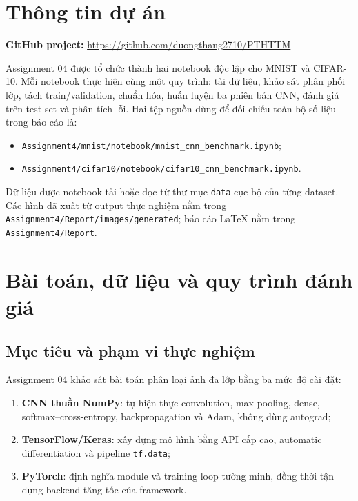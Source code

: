 \documentclass[12pt,a4paper]{report}
\newcommand{\modelpath}[1]{\texttt{#1}}
\begin{document}
\chapter*{Thông tin dự án}

\noindent\textbf{GitHub project:}
\url{https://github.com/duongthang2710/PTHTTM}

\vspace{0.35cm}
\noindent
Assignment 04 được tổ chức thành hai notebook độc lập cho MNIST và CIFAR-10.
Mỗi notebook thực hiện cùng một quy trình: tải dữ liệu, khảo sát phân phối lớp,
tách train/validation, chuẩn hóa, huấn luyện ba phiên bản CNN, đánh giá trên test
set và phân tích lỗi. Hai tệp nguồn dùng để đối chiếu toàn bộ số liệu trong báo
cáo là:
\begin{itemize}
    \item \modelpath{Assignment4/mnist/notebook/mnist\_cnn\_benchmark.ipynb};
    \item \modelpath{Assignment4/cifar10/notebook/cifar10\_cnn\_benchmark.ipynb}.
\end{itemize}

\noindent
Dữ liệu được notebook tải hoặc đọc từ thư mục \modelpath{data} cục bộ của từng
dataset. Các hình đã xuất từ output thực nghiệm nằm trong
\modelpath{Assignment4/Report/images/generated}; báo cáo \LaTeX{} nằm trong
\modelpath{Assignment4/Report}.
\newpage

\chapter{Bài toán, dữ liệu và quy trình đánh giá}

\section{Mục tiêu và phạm vi thực nghiệm}
Assignment 04 khảo sát bài toán phân loại ảnh đa lớp bằng ba mức độ cài đặt:
\begin{enumerate}
    \item \textbf{CNN thuần NumPy}: tự hiện thực convolution, max pooling,
    dense, softmax--cross-entropy, backpropagation và Adam, không dùng autograd;
    \item \textbf{TensorFlow/Keras}: xây dựng mô hình bằng API cấp cao,
    automatic differentiation và pipeline \texttt{tf.data};
    \item \textbf{PyTorch}: định nghĩa module và training loop tường minh,
    đồng thời tận dụng backend tăng tốc của framework.
\end{enumerate}
\end{document}
